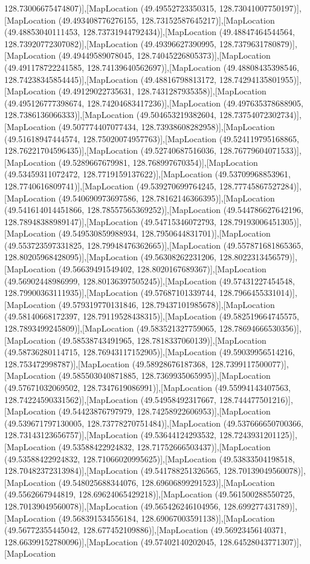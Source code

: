128.73006675474807)],[MapLocation (49.49552723350315, 128.73041007750197)],[MapLocation (49.493408776276155, 128.73152587645217)],[MapLocation (49.48853040111453, 128.73731944792434)],[MapLocation (49.48847464544564, 128.73920772307082)],[MapLocation (49.49396627390995, 128.7379631780879)],[MapLocation (49.49449589078045, 128.74045226805373)],[MapLocation (49.491178722241585, 128.74139640562697)],[MapLocation (49.48808435398546, 128.74238345854445)],[MapLocation (49.48816798813172, 128.74294135801955)],[MapLocation (49.49129022735631, 128.7431287935358)],[MapLocation (49.495126777398674, 128.74204683417236)],[MapLocation (49.497635378688905, 128.7386136066333)],[MapLocation (49.504653219382604, 128.73754072302734)],[MapLocation (49.507774407077434, 128.73938608282958)],[MapLocation (49.51618947444574, 128.75020074957763)],[MapLocation (49.524119795168865, 128.76221704596435)],[MapLocation (49.52740687516036, 128.76779604071533)],[MapLocation (49.5289667679981, 128.768997670354)],[MapLocation (49.53459311072472, 128.7719159137622)],[MapLocation (49.53709968853961, 128.7740616809741)],[MapLocation (49.539270699764245, 128.77745867527284)],[MapLocation (49.540690973697586, 128.78162146366395)],[MapLocation (49.541614014451866, 128.78557565369252)],[MapLocation (49.544786627642196, 128.78948388989147)],[MapLocation (49.54715346072793, 128.79193006451305)],[MapLocation (49.549530859988934, 128.7950644831701)],[MapLocation (49.553723597331825, 128.79948476362665)],[MapLocation (49.557871681865365, 128.80205968428095)],[MapLocation (49.56308262231206, 128.8022313456579)],[MapLocation (49.56639491549402, 128.8020167689367)],[MapLocation (49.56902448986999, 128.80136397505245)],[MapLocation (49.57431227454548, 128.79900363111935)],[MapLocation (49.57687101339744, 128.7966455331014)],[MapLocation (49.579319770131846, 128.79437101985678)],[MapLocation (49.58140668172397, 128.79119528438315)],[MapLocation (49.582519664745575, 128.7893499245809)],[MapLocation (49.583521327759065, 128.78694666530356)],[MapLocation (49.58538743491965, 128.7818337060139)],[MapLocation (49.58736280114715, 128.76943117152905)],[MapLocation (49.59039956514216, 128.753472998787)],[MapLocation (49.58928676187368, 128.7399117500077)],[MapLocation (49.585503040871885, 128.7369935065995)],[MapLocation (49.57671032069502, 128.7347619086991)],[MapLocation (49.55994143407563, 128.74224590331562)],[MapLocation (49.54958492317667, 128.744477501216)],[MapLocation (49.54423876797979, 128.74258922606953)],[MapLocation (49.539671797130005, 128.73778270751484)],[MapLocation (49.537666650700366, 128.73143123656757)],[MapLocation (49.53644124293532, 128.7243931201125)],[MapLocation (49.53588422924832, 128.71752666503437)],[MapLocation (49.53588422924832, 128.71066020995625)],[MapLocation (49.53833504198518, 128.70482372313984)],[MapLocation (49.541788251326565, 128.70139049560078)],[MapLocation (49.548025688344076, 128.69606899291523)],[MapLocation (49.5562667944819, 128.69624065429218)],[MapLocation (49.561500288550725, 128.70139049560078)],[MapLocation (49.565426246104956, 128.699277431789)],[MapLocation (49.568391534556184, 128.69067003591138)],[MapLocation (49.56772355445042, 128.677452109886)],[MapLocation (49.56923456140371, 128.66399152780096)],[MapLocation (49.57402140202045, 128.64528043771307)],[MapLocation 